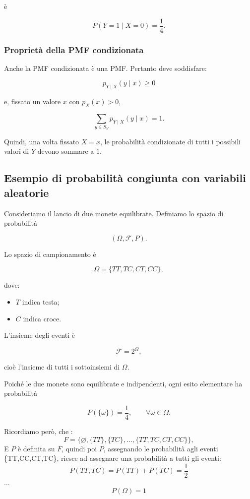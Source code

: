 è

$$
\boxed{
P(Y=1\mid X=0)=\frac14.
}
$$

\subsubsection{Proprietà della PMF condizionata}

Anche la PMF condizionata è una PMF. Pertanto deve soddisfare:

$$
p_{Y\mid X}(y\mid x)\geq0
$$

e, fissato un valore $x$ con $p_X(x)>0$,

$$
\boxed{
\sum_{y\in S_Y}
p_{Y\mid X}(y\mid x)=1.
}
$$

Quindi, una volta fissato $X=x$, le probabilità condizionate di tutti i possibili valori di $Y$ devono sommare a $1$.



\subsection{Esempio di probabilità congiunta con variabili aleatorie}

Consideriamo il lancio di due monete equilibrate. Definiamo lo spazio di probabilità

$$
(\Omega,\mathcal{F},P).
$$

Lo spazio di campionamento è

$$
\Omega=\{TT,TC,CT,CC\},
$$

dove:
\begin{itemize}
\item $T$ indica testa;
\item $C$ indica croce.
\end{itemize}

L'insieme degli eventi è

$$
\mathcal{F}=2^\Omega,
$$

cioè l'insieme di tutti i sottoinsiemi di $\Omega$.

Poiché le due monete sono equilibrate e indipendenti, ogni esito elementare ha probabilità

$$
P(\{\omega\})=\frac14,
\qquad \forall\omega\in\Omega.
$$

Ricordiamo però, che :
\begin{equation}
    F=\{\varnothing,\{TT\},\{TC\},\ldots,\{TT,TC,CT,CC\}\},
\end{equation}
E $P$ è definita su $F$, quindi poi $P$, assegnando le probabilità agli eventi \{TT,CC,CT,TC\}, riesce ad assegnare una probabilità a tutti gli eventi:
\newpage
\[
P({TT,TC})=P({TT})+P({TC})=\frac{1}{2}
\]
$\dots$
\[
P(\Omega)=1
\]



